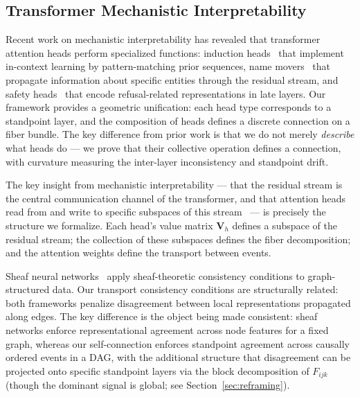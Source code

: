 
\subsection{Transformer Mechanistic Interpretability}
\label{sec:mech-interp}

Recent work on mechanistic interpretability has revealed that transformer attention
heads perform specialized functions: induction heads~\cite{olsson2022induction}
that implement in-context learning by pattern-matching prior sequences, name
movers~\cite{wang2023interpretability} that propagate information about specific
entities through the residual stream, and safety
heads~\cite{zou2023representation} that encode refusal-related
representations in late layers. Our framework provides a geometric unification:
each head type corresponds to a standpoint layer, and the composition of heads
defines a discrete connection on a fiber bundle. The key difference from prior
work is that we do not merely \emph{describe} what heads do --- we prove that
their collective operation defines a connection, with curvature measuring
the inter-layer inconsistency and standpoint drift.

The key insight from mechanistic interpretability --- that the residual stream
is the central communication channel of the transformer, and that attention heads
read from and write to specific subspaces of this
stream~\cite{elhage2021mathematical} --- is precisely the structure we formalize.
Each head's value matrix $\mathbf{V}_h$ defines a subspace of the residual stream;
the collection of these subspaces defines the fiber decomposition; and the
attention weights define the transport between events.

Sheaf neural networks~\cite{hansen2020toward, bodnar2022neural} apply
sheaf-theoretic consistency conditions to graph-structured data. Our transport
consistency conditions are structurally related: both frameworks penalize
disagreement between local representations propagated along edges. The key
difference is the object being made consistent: sheaf networks enforce
representational agreement across node features for a fixed graph, whereas our
self-connection enforces standpoint agreement across causally ordered events in
a DAG, with the additional structure that disagreement can be projected onto
specific standpoint layers via the block decomposition of $F_{ijk}$ (though the
dominant signal is global; see Section~\ref{sec:reframing}).

